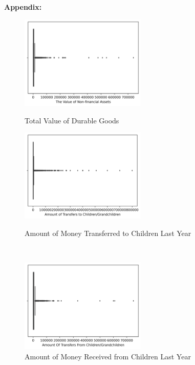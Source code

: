 \documentclass[12pt]{article}
\begin{document}
\clearpage



\clearpage
\vspace{5em}
{\LARGE \bf Appendix:}
\begin{figure}[htbp]
\centering
\begin{minipage}[t]{0.48\textwidth}
\centering
\includegraphics[width=6cm]{Pic/Impute_Durable_Box.png}
\caption{Total Value of Durable Goods}\label{Impute_Durable_Box}
\end{minipage}
\begin{minipage}[t]{0.48\textwidth}
\centering
\includegraphics[width=6cm]{Pic/Impute_MoneytChild_Box.png}
\caption{Amount of Money Transferred to Children Last Year}\label{Impute_MoneytChild_Box}
\end{minipage}\\
\begin{minipage}[t]{0.48\textwidth}
\centering
\includegraphics[width=6cm]{Pic/Impute_MoneyfChild_Box.png}
\caption{Amount of Money Received from Children Last Year}\label{Impute_MoneyfChild_Box}
\end{minipage} 
\end{figure}
\end{document}

